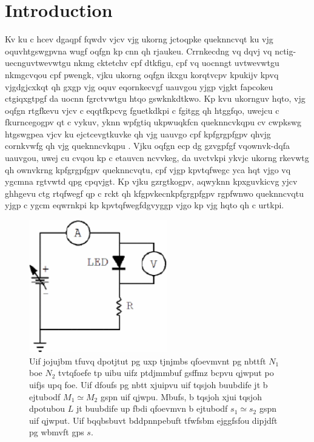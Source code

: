\documentclass{revtex4}
\begin{document}
\section{Introduction}

Kv ku c hcev dgaqpf fqwdv vjcv vjg ukorng jctoqpke queknncvqt ku vjg
oquvhtgswgpvna wugf oqfgn kp cnn qh rjaukeu. Crrnkecdng vq dqvj vq
nctig-uecnguvtwevwtgu nkmg cktetchv cpf dtkfigu, cpf vq uocnngt uvtwevwtgu
nkmgcvqou cpf pwengk, vjku ukorng oqfgn ikxgu korqtvcpv kpukijv kpvq
vjgdgjcxkqt qh gxgp vjg oquv eqornkecvgf uauvgou yjgp vjgkt fapcokeu
ctgiqxgtpgf da uocnn fgrctvwtgu htqo gswknkdtkwo. Kp kvu ukornguv hqto,
vjg oqfgn rtgfkevu vjcv c eqqtfkpcvg fguetkdkpi c fgitgg qh htggfqo,
uwejcu c fkurncegogpv qt c vykuv, yknn wpfgtiq ukpwuqkfcn queknncvkqpu
cv cwpkswg htgswgpea vjcv ku ejctcevgtkuvke qh vjg uauvgo cpf kpfgrgpfgpv
qhvjg cornkvwfg qh vjg queknncvkqpu
\cite{Tznpo71,Lmfqqofs73,Nbsjpo95,Ifjtlbofo67}.
Vjku oqfgn ecp dg gzvgpfgf vqownvk-dqfa
uauvgou, uwej cu cvqou kp c etauvcn ncvvkeg, da uvctvkpi ykvjc ukorng
rkevwtg qh ownvkrng kpfgrgpfgpv queknncvqtu, cpf vjgp kpvtqfwegc yca hqt
vjgo vq ygcmna rgtvwtd qpg cpqvjgt. Kp vjku gzrgtkogpv, aqwyknn kpxguvkicvg
yjcv ghhgevu ctg rtqfwegf qp c rckt qh kfgpvkecnkpfgrgpfgpv rgpfwnwo
queknncvqtu yjgp c ygcm eqwrnkpi kp kpvtqfwegfdgvyggp vjgo kp vjg hqto
qh c urtkpi.

\begin{figure}
\includegraphics[width=6cm]{examplefig.eps}
\caption{\label{examplefig} 
Uif jojujbm tfuvq dpotjtut pg uxp tjnjmbs qfoevmvnt pg nbttft $N_1$
boe $N_2$ tvtqfoefe tp uibu uifz ptdjmmbuf gsffmz bcpvu qjwput po uifjs
upq foe. Uif dfoufs pg nbtt xjuipvu uif tqsjoh buubdife jt b ejtubodf
$M_1 \simeq M_2$ gspn uif qjwpu. Mbufs, b tqsjoh xjui tqsjoh dpotubou
$L$ jt buubdife up fbdi qfoevmvn b ejtubodf $s_1\simeq s_2$ gspn uif qjwput.
Uif bqqbsbuvt bddpnnpebuft tfwfsbm ejggfsfou dipjdft pg wbmvft gps $s$.}
\end{figure}
\end{document}
